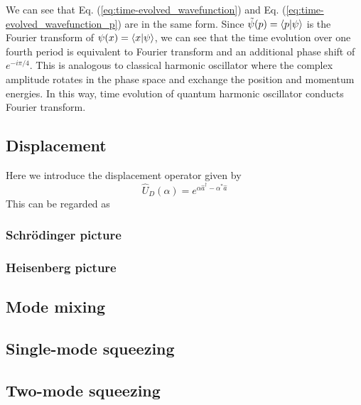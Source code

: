 \documentclass{book}
\begin{document}
We can see that Eq. (\ref{eq:time-evolved_wavefunction}) and Eq. (\ref{eq:time-evolved_wavefunction_p}) are in the same form. Since $\tilde \psi(p) = \braket{p|\psi}$ is the Fourier transform of $\psi(x)=\braket{x|\psi}$, we can see that the time evolution over one fourth period is equivalent to Fourier transform and an additional phase shift of $e^{-i\pi/4}$. This is analogous to classical harmonic oscillator where the complex amplitude rotates in the phase space and exchange the position and momentum energies. In this way, time evolution of quantum harmonic oscillator conducts Fourier transform.

\begin{comment}
\begin{equation}
  \begin{aligned}
	\braket{p|n} = \int\braket{p|x}\braket{x|n}	dx
  \end{aligned}
\end{equation}
\end{comment}

\subsection{Displacement}
Here we introduce the displacement operator given by
\begin{equation}
  \hat U_D(\alpha) = e^{\alpha \hat a^\dagger - \alpha^* \hat a}
\end{equation}
This can be regarded as 

\subsubsection{Schr\"odinger picture}

\subsubsection{Heisenberg picture}


\subsection{Mode mixing}

\subsection{Single-mode squeezing}

\subsection{Two-mode squeezing}
\end{document}
